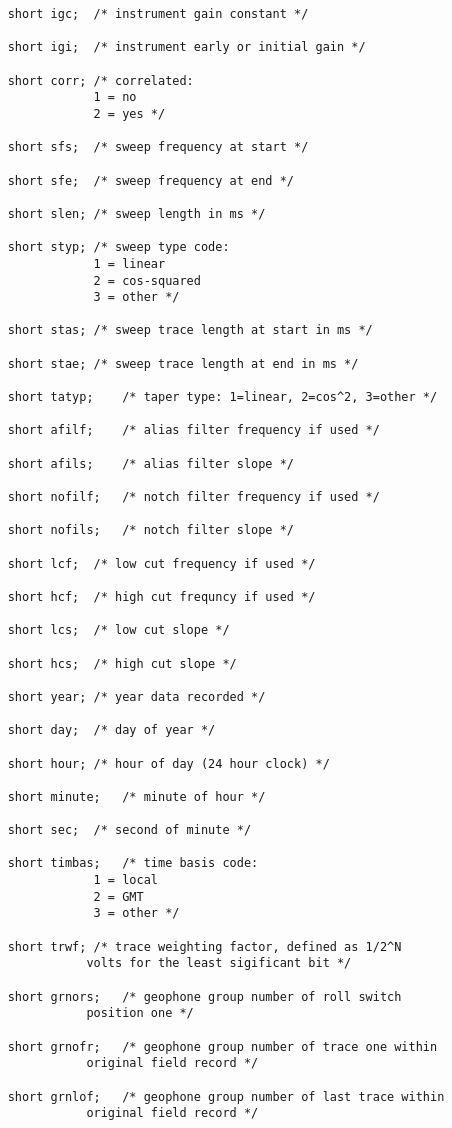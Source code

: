 {\begin{verbatim}
	short igc;	/* instrument gain constant */

	short igi;	/* instrument early or initial gain */

	short corr;	/* correlated:
				1 = no
				2 = yes */

	short sfs;	/* sweep frequency at start */

	short sfe;	/* sweep frequency at end */

	short slen;	/* sweep length in ms */

	short styp;	/* sweep type code:
				1 = linear
				2 = cos-squared
				3 = other */

	short stas;	/* sweep trace length at start in ms */

	short stae;	/* sweep trace length at end in ms */

	short tatyp;	/* taper type: 1=linear, 2=cos^2, 3=other */

	short afilf;	/* alias filter frequency if used */

	short afils;	/* alias filter slope */

	short nofilf;	/* notch filter frequency if used */

	short nofils;	/* notch filter slope */

	short lcf;	/* low cut frequency if used */

	short hcf;	/* high cut frequncy if used */

	short lcs;	/* low cut slope */

	short hcs;	/* high cut slope */

	short year;	/* year data recorded */

	short day;	/* day of year */

	short hour;	/* hour of day (24 hour clock) */

	short minute;	/* minute of hour */

	short sec;	/* second of minute */

	short timbas;	/* time basis code:
				1 = local
				2 = GMT
				3 = other */

	short trwf;	/* trace weighting factor, defined as 1/2^N
			   volts for the least sigificant bit */

	short grnors;	/* geophone group number of roll switch
			   position one */

	short grnofr;	/* geophone group number of trace one within
			   original field record */

	short grnlof;	/* geophone group number of last trace within
			   original field record */


\end{verbatim}}
